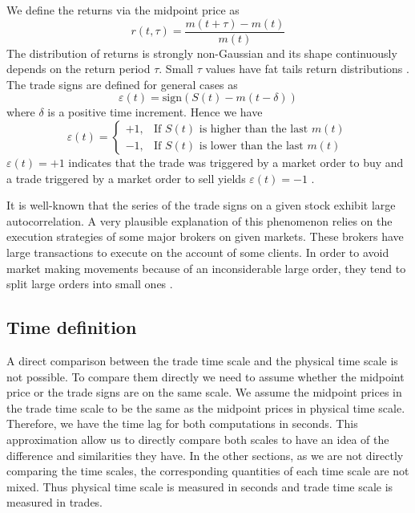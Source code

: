 We define the returns via the midpoint price as
\begin{equation}\label{eq:midpoint_price_return}
    r\left(t,\tau\right) = \frac{m\left(t+\tau\right)-m\left(t\right)}
    {m\left(t\right)}
\end{equation}
The distribution of returns is strongly non-Gaussian and its shape continuously
depends on the return period $\tau$. Small $\tau$ values have fat tails return
distributions \cite{subtle_nature}. The trade signs are defined for general
cases as
\begin{equation}\label{eq:trade_sign_general}
    \varepsilon\left(t\right)=\text{sign}\left(S\left(t\right)
    -m\left(t-\delta\right)\right)
\end{equation}
where $\delta$ is a positive time increment. Hence we have
\begin{equation}\label{eq:trade_sign_results}
    \varepsilon\left(t\right)=\left\{
    \begin{array}{cc}
    +1, & \text{If } S\left(t\right)
    \text{ is higher than the last } m\left( t \right)\\
    -1, & \text{If } S\left(t\right)
    \text{ is lower than the last } m\left( t \right)
    \end{array}\right.
\end{equation}
$\varepsilon(t) = +1$ indicates that the trade was triggered by a market order
to buy and a trade triggered by a market order to sell yields
$\varepsilon(t) = -1$
\cite{subtle_nature,Bouchaud_2004,spread_changes_affect,quant_stock_price_response,order_flow_persistent}.

It is well-known that the series of the trade signs on a given stock exhibit
large autocorrelation. A very plausible explanation of this phenomenon relies
on the execution strategies of some major brokers on given markets. These
brokers have large transactions to execute on the account of some clients. In
order to avoid market making movements because of an inconsiderable large
order, they tend to split large orders into small ones \cite{empirical_facts}.

\subsection{Time definition}\label{subsec:time_definition}

A direct comparison between the trade time scale and the physical time scale is
not possible. To compare them directly we need to assume whether the midpoint
price or the trade signs are on the same scale. We assume the midpoint prices
in the trade time scale to be the same as the midpoint prices in physical time
scale. Therefore, we have the time lag for both computations in seconds. This
approximation allow us to directly compare both scales to have an idea of the
difference and similarities they have. In the other sections, as we are not
directly comparing the time scales, the corresponding quantities of each time
scale are not mixed. Thus physical time scale is measured in seconds and trade
time scale is measured in trades.

